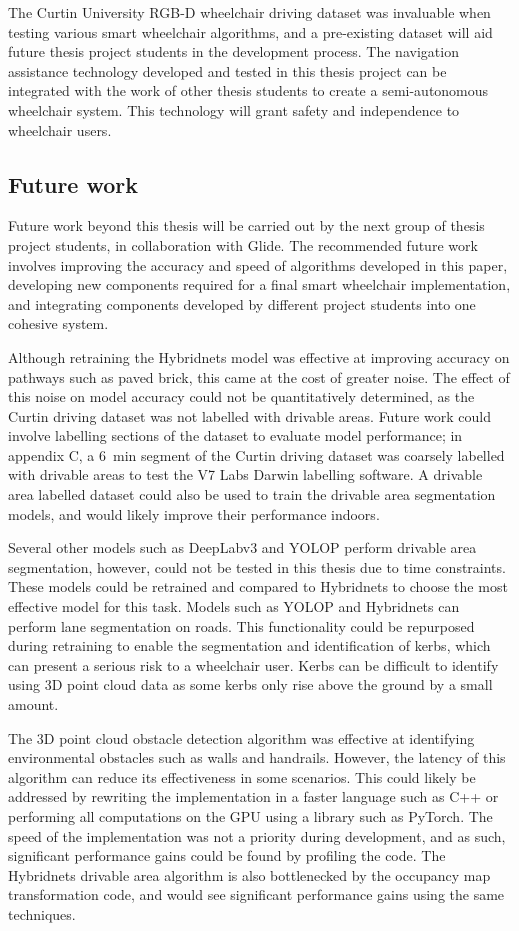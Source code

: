 The Curtin University RGB-D wheelchair driving dataset was invaluable
when testing various smart wheelchair algorithms, and a pre-existing dataset will
aid future thesis project students in the development process.
The navigation assistance technology developed and tested in this thesis project
can be integrated with the work of other thesis students to create a semi-autonomous
wheelchair system. This technology will grant safety and independence
to wheelchair users.

\pagebreak
\subsection{Future work}
\label{sec:future_work}
Future work beyond this thesis will be carried out by the next
group of thesis project students, in collaboration with Glide.
The recommended future work involves improving the accuracy
and speed of algorithms developed in this paper, developing
new components required for a final smart wheelchair implementation,
and integrating components developed by different project students into 
one cohesive system.

Although retraining the Hybridnets model was effective at improving
accuracy on pathways such as paved brick, this came at the cost
of greater noise. The effect of this noise on model accuracy
could not be quantitatively determined, as the Curtin driving dataset
was not labelled with drivable areas. Future work could involve labelling sections of the
dataset to evaluate model performance; in appendix C, a \SI{6}{\minute} segment
of the Curtin driving dataset was coarsely labelled with drivable areas to
test the V7 Labs Darwin labelling software. A drivable area labelled dataset could
also be used to train the drivable area segmentation models,
and would likely improve their performance indoors.

Several other models such as DeepLabv3 and YOLOP perform drivable area
segmentation, however, could not be tested in this thesis due to time constraints.
These models could be retrained and compared to Hybridnets
to choose the most effective model for this task.
Models such as YOLOP and Hybridnets can perform
lane segmentation on roads. This functionality could be repurposed
during retraining to enable the segmentation and identification of kerbs,
which can present a serious risk to a wheelchair user. Kerbs can be difficult
to identify using 3D point cloud data as some kerbs only rise above
the ground by a small amount.

The 3D point cloud obstacle detection algorithm was effective
at identifying environmental obstacles such as walls and handrails.
However, the latency of this algorithm can reduce its effectiveness
in some scenarios. This could likely be addressed by rewriting the
implementation in a faster language such as C++ or performing all
computations on the GPU using a library such as PyTorch.
The speed of the implementation was not a priority during development,
and as such, significant performance gains could be found by
profiling the code. The Hybridnets drivable area
algorithm is also bottlenecked by the occupancy map transformation code,
and would see significant performance gains using the same techniques.

